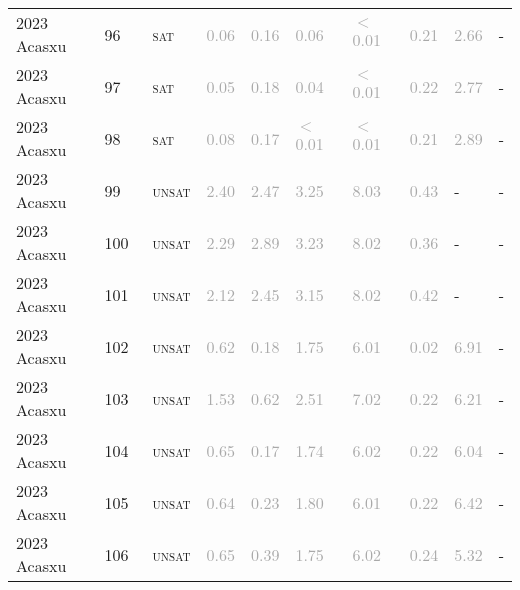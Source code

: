 \begin{center}
{\begin{longtable}{@{}llllllllll@{}}
2023 Acasxu & 96 & ~\textsc{sat} & \textcolor{darkgray}{0.06} & \textcolor{darkgray}{0.16} & \textcolor{darkgray}{0.06} & \textcolor{darkgray}{$<$0.01} & \textcolor{darkgray}{0.21} & \textcolor{darkgray}{2.66} & - \\
2023 Acasxu & 97 & ~\textsc{sat} & \textcolor{darkgray}{0.05} & \textcolor{darkgray}{0.18} & \textcolor{darkgray}{0.04} & \textcolor{darkgray}{$<$0.01} & \textcolor{darkgray}{0.22} & \textcolor{darkgray}{2.77} & - \\
2023 Acasxu & 98 & ~\textsc{sat} & \textcolor{darkgray}{0.08} & \textcolor{darkgray}{0.17} & \textcolor{darkgray}{$<$0.01} & \textcolor{darkgray}{$<$0.01} & \textcolor{darkgray}{0.21} & \textcolor{darkgray}{2.89} & - \\
2023 Acasxu & 99 & ~\textsc{unsat} & \textcolor{darkgray}{2.40} & \textcolor{darkgray}{2.47} & \textcolor{darkgray}{3.25} & \textcolor{darkgray}{8.03} & \textcolor{darkgray}{0.43} & - & - \\
2023 Acasxu & 100 & ~\textsc{unsat} & \textcolor{darkgray}{2.29} & \textcolor{darkgray}{2.89} & \textcolor{darkgray}{3.23} & \textcolor{darkgray}{8.02} & \textcolor{darkgray}{0.36} & - & - \\
2023 Acasxu & 101 & ~\textsc{unsat} & \textcolor{darkgray}{2.12} & \textcolor{darkgray}{2.45} & \textcolor{darkgray}{3.15} & \textcolor{darkgray}{8.02} & \textcolor{darkgray}{0.42} & - & - \\
2023 Acasxu & 102 & ~\textsc{unsat} & \textcolor{darkgray}{0.62} & \textcolor{darkgray}{0.18} & \textcolor{darkgray}{1.75} & \textcolor{darkgray}{6.01} & \textcolor{darkgray}{0.02} & \textcolor{darkgray}{6.91} & - \\
2023 Acasxu & 103 & ~\textsc{unsat} & \textcolor{darkgray}{1.53} & \textcolor{darkgray}{0.62} & \textcolor{darkgray}{2.51} & \textcolor{darkgray}{7.02} & \textcolor{darkgray}{0.22} & \textcolor{darkgray}{6.21} & - \\
2023 Acasxu & 104 & ~\textsc{unsat} & \textcolor{darkgray}{0.65} & \textcolor{darkgray}{0.17} & \textcolor{darkgray}{1.74} & \textcolor{darkgray}{6.02} & \textcolor{darkgray}{0.22} & \textcolor{darkgray}{6.04} & - \\
2023 Acasxu & 105 & ~\textsc{unsat} & \textcolor{darkgray}{0.64} & \textcolor{darkgray}{0.23} & \textcolor{darkgray}{1.80} & \textcolor{darkgray}{6.01} & \textcolor{darkgray}{0.22} & \textcolor{darkgray}{6.42} & - \\
2023 Acasxu & 106 & ~\textsc{unsat} & \textcolor{darkgray}{0.65} & \textcolor{darkgray}{0.39} & \textcolor{darkgray}{1.75} & \textcolor{darkgray}{6.02} & \textcolor{darkgray}{0.24} & \textcolor{darkgray}{5.32} & - \\

\end{longtable}}
\end{center}
